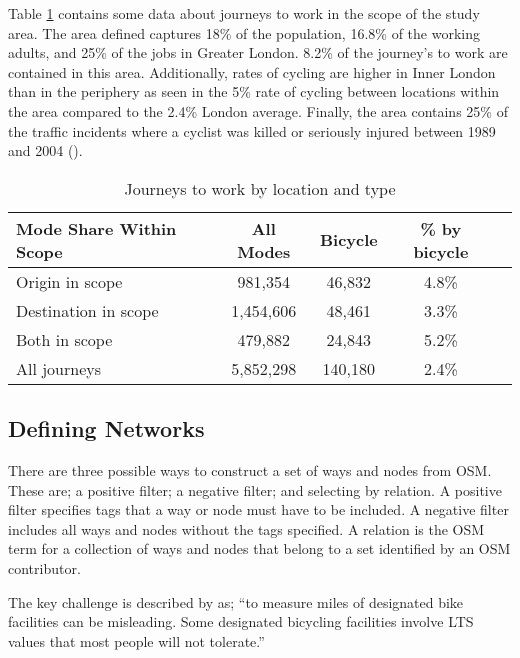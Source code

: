 Table \ref{table:commute_data} contains some data about journeys to work in the scope of the study area. The area defined captures 18\% of the population, 16.8\% of the working adults, and 25\% of the jobs in Greater London. 8.2\% of the journey's to work are contained in this area. Additionally, rates of cycling are higher in Inner London than in the periphery as seen in the 5\% rate of cycling between locations within the area compared to the 2.4\% London average. Finally, the area contains 25\% of the traffic incidents where a cyclist was killed or seriously injured between 1989 and 2004 (\cite{cyclistksi}). 
 
\begin{table}[]
\centering
\begin{tabular}{lcccl}
 Mode Share Within Scope & All Modes & Bicycle & \% by bicycle &  \\
 \hline
 Origin in scope &  981,354 & 46,832 & 4.8\% &  \\
 Destination in scope & 1,454,606 & 48,461 & 3.3\% &  \\
 Both in scope & 479,882 & 24,843 & 5.2\% & \\
 All journeys & 5,852,298 & 140,180 & 2.4\% \\ 
\end{tabular}
\caption{Journeys to work by location and type}
\label{table:commute_data}
\end{table}

\subsection{Defining Networks}

There are three possible ways to construct a set of ways and nodes from OSM. These are; a positive filter; a negative filter; and selecting by relation. A positive filter specifies tags that a way or node must have to be included. A negative filter includes all ways and nodes without the tags specified. A relation is the OSM term for a collection of ways and nodes that belong to a set identified by an OSM contributor. 

The key challenge is described by \textcite{furth2016network} as; ``to measure miles of designated bike facilities can be misleading. Some designated bicycling facilities involve LTS values that most people will not tolerate.''

